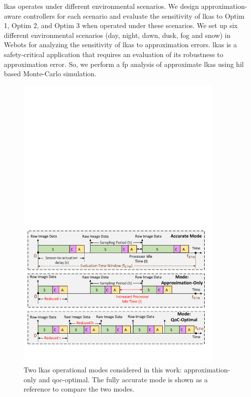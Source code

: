 \par \Gls{lkas} operates under different environmental scenarios. We design approximation-aware controllers for each scenario and evaluate the sensitivity of \gls{lkas} to Optim 1, Optim 2, and Optim 3 when operated under these scenarios. We set up six different environmental scenarios (day, night, dawn, dusk, fog and snow) in Webots for analyzing the sensitivity of \gls{lkas} to approximation errors. \gls{lkas} is a safety-critical application that requires an evaluation of its robustness to approximation error. So, we perform a \gls{fp} analysis of approximate \gls{lkas} using \gls{hil} based Monte-Carlo simulation. 
\begin{figure}[t]
	\centering
	\includegraphics[width= 0.9\textwidth]{figs/modes.pdf}
	\caption{{Two \gls{lkas} operational modes considered in this work: approximation-only and \gls{qoc}-optimal. The fully accurate mode is shown as a reference to compare the two modes.}}
	\label{fig:modes}
	\vspace{-10pt}
\end{figure}
